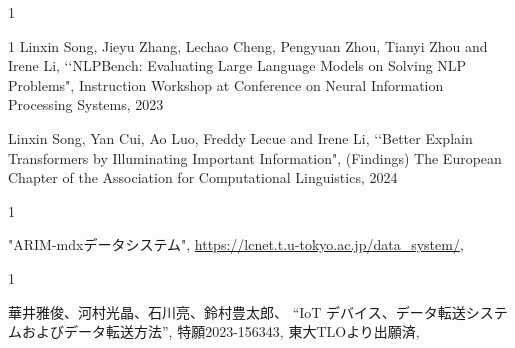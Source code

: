 \begin{査読付}{1}
\begin{査読付}{1}
Linxin Song, Jieyu Zhang, Lechao Cheng, Pengyuan Zhou, Tianyi Zhou and Irene Li, \lq\lq NLPBench: Evaluating Large Language Models on Solving NLP Problems", Instruction Workshop at Conference on Neural Information Processing Systems, 2023


Linxin Song, Yan Cui, Ao Luo, Freddy Lecue and Irene Li, \lq\lq Better Explain Transformers by Illuminating Important Information", (Findings) The European Chapter of the Association for Computational Linguistics, 2024


\end{査読付}




\end{査読付}

\begin{公開}{1}

"ARIM-mdxデータシステム",
\url{https://lcnet.t.u-tokyo.ac.jp/data_system/},



\end{公開}

\begin{特許}{1}

華井雅俊、河村光晶、石川亮、鈴村豊太郎、
“IoT デバイス、データ転送システムおよびデータ転送方法”,
特願2023-156343,
東大TLOより出願済,


\end{特許}

